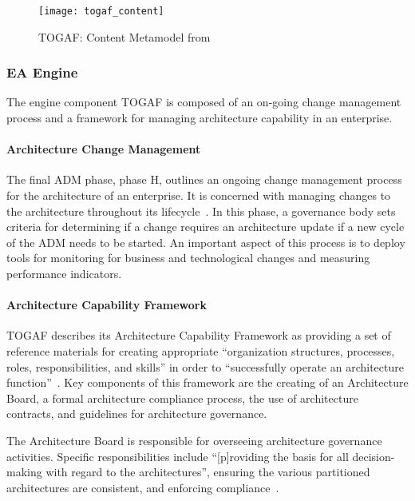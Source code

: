 \begin{figure}
\texttt{[image: togaf\_content]}
\caption{TOGAF: Content Metamodel from \cite[Sec. 34.2]{togaf9.1}}
\label{fig:togaf_content}
\end{figure}

\subsubsection{EA Engine}

The engine component TOGAF is composed of an on-going change management process and a framework for managing architecture capability in an enterprise.

\paragraph*{Architecture Change Management}

The final ADM phase, phase H, outlines an ongoing change management process for the architecture of an enterprise.  It is concerned with managing changes to the architecture throughout its lifecycle~\cite[Ch. 16]{togaf9.1}. In this phase, a governance body sets criteria for determining if a change requires an architecture update if a new cycle of the ADM needs to be started. An important aspect of this process is to deploy tools for monitoring for business and technological changes and measuring performance indicators. 

\paragraph*{Architecture Capability Framework}

TOGAF describes its Architecture Capability Framework as providing a set of reference materials for creating appropriate ``organization structures, processes, roles, responsibilities, and skills'' in order to ``successfully operate an architecture function''~\cite[Sec. 45.1]{togaf9.1}. Key components of this framework are the creating of an Architecture Board, a formal architecture compliance process, the use of architecture contracts, and guidelines for architecture governance. 

The Architecture Board is responsible for overseeing architecture governance activities. Specific responsibilities include ``[p]roviding the basis for all decision-making with regard to the architectures'', ensuring the various partitioned architectures are consistent, and enforcing compliance~\cite[Ch. 47]{togaf9.1}. 

